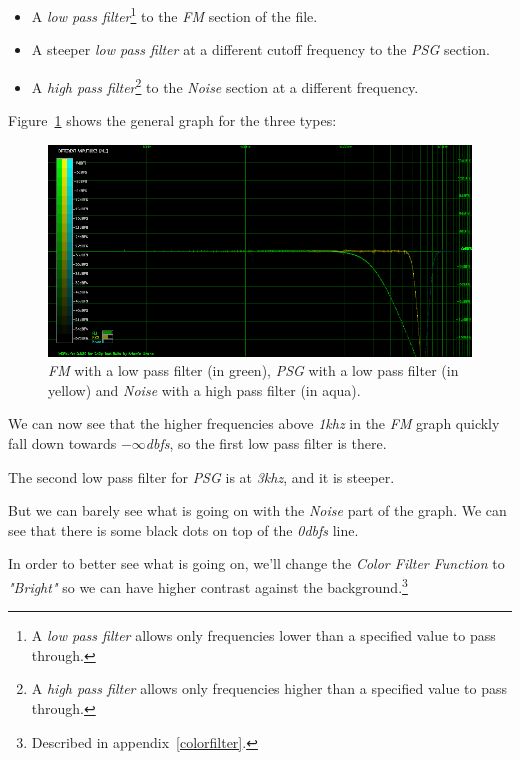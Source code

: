 \documentclass[10pt,a4paper]{report}
\newcommand{\khz}[1]{\textit{\mbox{#1\acrshort{khz}}}}
\newcommand{\db}[1]{\textit{\mbox{#1\acrshort{dbfs}}}}
\begin{document}
\begin{itemize}
	\item A \textit{low pass filter}\footnote{A \textit{low pass filter} allows only frequencies lower than a specified value to pass through.} to the \textit{FM} section of the file.
	\item A steeper \textit{low pass filter} at a different cutoff frequency to the \textit{PSG} section.
	\item A \textit{high pass filter}\footnote{A \textit{high pass filter} allows only frequencies higher than a specified value to pass through.} to the \textit{Noise} section at a different frequency.
\end{itemize}

Figure~\ref{fig:plot4-1-all} shows the general graph for the three types:

\begin{figure}[H]
	\centering
	\includegraphics[width=1.0\linewidth]{images/interpretation/Plot4-1-All.png}
	\caption[All Plotted]{\textit{FM} with a low pass filter (in green), \textit{PSG} with a low pass filter (in yellow) and \textit{Noise} with a high pass filter (in aqua).}
	\label{fig:plot4-1-all}
\end{figure}

We can now see that the higher frequencies above \khz{1} in the \textit{FM} graph quickly fall down towards \db{$-\infty$}, so the first low pass filter is there.

The second low pass filter for \textit{PSG} is at \khz{3}, and it is steeper.

But we can barely see what is going on with the \textit{Noise} part of the graph. We can see that there is some black dots on top of the \db{0} line.

In order to better see what is going on, we'll change the \textit{Color Filter Function} to \textit{"Bright"} so we can have higher contrast against the background.\footnote{Described in appendix~\ref{colorfilter}.}
\end{document}
